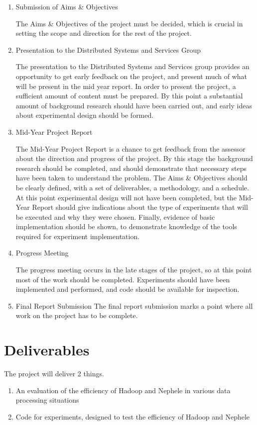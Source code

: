 \begin{enumerate}
	\item Submission of Aims \& Objectives

	The Aims \& Objectives of the project must be decided, which is crucial in setting the scope and direction for the rest of the project.

	\item Presentation to the Distributed Systems and Services Group

	The presentation to the Distributed Systems and Services group provides an opportunity to get early feedback on the project, and present much of what will be present in the mid year report. In order to present the project, a sufficient amount of content must be prepared. By this point a substantial amount of background research should have been carried out, and early ideas about experimental design should be formed.

	\item Mid-Year Project Report

	The Mid-Year Project Report is a chance to get feedback from the assessor about the direction and progress of the project. By this stage the background research should be completed, and should demonstrate that necessary steps have been taken to understand the problem. The Aims \& Objectives should be clearly defined, with a set of deliverables, a methodology, and a schedule. At this point experimental design will not have been completed, but the Mid-Year Report should give indications about the type of experiments that will be executed and why they were chosen. Finally, evidence of basic implementation should be shown, to demonstrate knowledge of the tools required for experiment implementation. 

	\item Progress Meeting

	The progress meeting occurs in the late stages of the project, so at this point most of the work should be completed. Experiments should have been implemented and performed, and code should be available for inspection.

	\item Final Report Submission
	The final report submission marks a point where all work on the project has to be complete. 
\end{enumerate}

\section{Deliverables}
The project will deliver 2 things.

\begin{enumerate}
	\item An evaluation of the efficiency of Hadoop and Nephele in various data processing situations
	\item Code for experiments, designed to test the efficiency of Hadoop and Nephele
\end{enumerate}